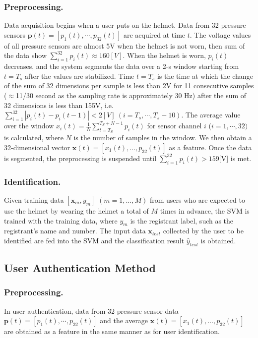 \documentclass[english,preprint,JIP]{ipsj}
\begin{document}
\subsubsection{Preprocessing.}
Data acquisition begins when a user puts on the helmet. Data from 32 pressure sensors $\bm{p}(t)=[p_1(t),\cdots,p_{32}(t)]$ are acquired at time $t$. The voltage values of all pressure sensors are almost 5V when the helmet is not worn, then sum of the data show $\sum_{i=1}^{32}p_i(t)\approx160[V]$. When the helmet is worn, $p_i(t)$ decreases, and the system segments the data over a 2-s window starting from $t=T_s$ after the values are stabilized. Time $t=T_s$ is the time at which the change of the sum of 32 dimensions per sample is less than 2V for 11 consecutive samples ($\approx$11/30 second as the sampling rate is approximately 30 Hz) after the sum of 32 dimensions is less than 155V, i.e. $\sum_{i=1}^{32}|p_i(t)-p_i(t-1)|<2[V]~(i=T_s,\cdots,T_s-10)$. The average value over the window $x_i(t)=\frac{1}{N}\sum_{t=T_S}^{T_S+N-1}p_i(t)$ for sensor channel $i$ ($i=1,\cdots,32)$ is calculated, where $N$ is the number of samples in the window. We then obtain a 32-dimensional vector $\bm{x}(t)=[x_{1}(t),\dots,p_{32}(t)]$ as a feature. Once the data is segmented, the preprocessing is suspended until $\sum_{i=1}^{32}p_i(t)>159$[V] is met.


\subsubsection{Identification.}
Given training data $[\bm{x}_m,y_m]$ $(m=1,\dots, M)$ from users who are expected to use the helmet by wearing the helmet a total of $M$ times in advance, the SVM is trained with the training data, where $y_m$ is the registrant label, such as the registrant's name and number. The input data $\bm{x}_{test}$ collected by the user to be identified are fed into the SVM and the classification result $\hat{y}_{test}$ is obtained.


\subsection{User Authentication Method}


\subsubsection{Preprocessing.}
In user authentication, data from 32 pressure sensor data $\bm{p}(t)=[p_1(t),\cdots,p_{32}(t)]$ and the average $\bm{x}(t)=[x_{1}(t),\dots,p_{32}(t)]$ are obtained as a feature in the same manner as for user identification.
\end{document}
